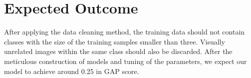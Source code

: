 \documentclass[10pt,twocolumn,letterpaper]{article}
\begin{document}
\section{Expected Outcome}
After applying the data cleaning method, the training data should not contain classes with the size of the training samples smaller than three. Visually unrelated images within the same class should also be discarded. After the meticulous construction of models and tuning of the parameters, we expect our model to achieve around 0.25 in GAP score.  



%
% 
%
%
{\small


}
\end{document}
